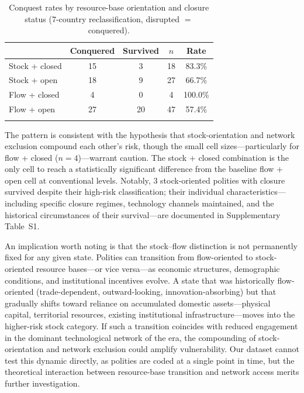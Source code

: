 \documentclass[pdflatex,sn-basic]{sn-jnl}
\theoremstyle{thmstyleone}%
\theoremstyle{thmstyletwo}%
\theoremstyle{thmstylethree}%
\begin{document}
\begin{table}[htbp]
\caption{Conquest rates by resource-base orientation and closure status (7-country reclassification, disrupted $=$ conquered).}
\label{tab:stockflow-closure}
\begin{tabular*}{\textwidth}{@{\extracolsep\fill}lcccc}
\toprule
 & Conquered & Survived & $n$ & Rate \\
\midrule
Stock + closed & 15 & 3 & 18 & 83.3\% \\
Stock + open & 18 & 9 & 27 & 66.7\% \\
Flow + closed & 4 & 0 & 4 & 100.0\% \\
Flow + open & 27 & 20 & 47 & 57.4\% \\
\botrule
\end{tabular*}
\end{table}

The pattern is consistent with the hypothesis that stock-orientation and network exclusion compound each other's risk, though the small cell sizes---particularly for flow + closed ($n = 4$)---warrant caution. The stock + closed combination is the only cell to reach a statistically significant difference from the baseline flow + open cell at conventional levels. Notably, 3 stock-oriented polities with closure survived despite their high-risk classification; their individual characteristics---including specific closure regimes, technology channels maintained, and the historical circumstances of their survival---are documented in Supplementary Table~S1.

An implication worth noting is that the stock--flow distinction is not permanently fixed for any given state. Polities can transition from flow-oriented to stock-oriented resource bases---or vice versa---as economic structures, demographic conditions, and institutional incentives evolve. A state that was historically flow-oriented (trade-dependent, outward-looking, innovation-absorbing) but that gradually shifts toward reliance on accumulated domestic assets---physical capital, territorial resources, existing institutional infrastructure---moves into the higher-risk stock category. If such a transition coincides with reduced engagement in the dominant technological network of the era, the compounding of stock-orientation and network exclusion could amplify vulnerability. Our dataset cannot test this dynamic directly, as polities are coded at a single point in time, but the theoretical interaction between resource-base transition and network access merits further investigation.
\end{document}
